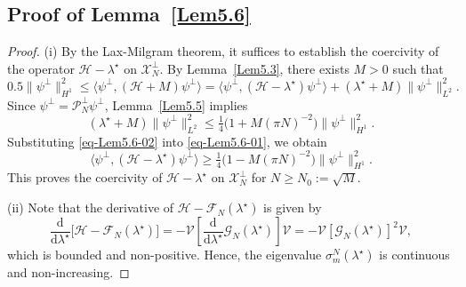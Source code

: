 \documentclass{sn-jnl}%
\numberwithin{equation}{section}
\theoremstyle{thmstyleone}%
\theoremstyle{thmstyletwo}%
\theoremstyle{thmstylethree}%
\begin{document}
\begin{appendices}
\section{Proof of Lemma~\ref{Lem5.6}}\label{proofLem5.6}
\begin{proof}
 (i) By the Lax-Milgram theorem, it suffices to establish the coercivity of the operator $\mathcal{H}-\lambda^\star$ on $\mathscr{X}_N^\perp$. 
By Lemma~\ref{Lem5.3}, there exists $M>0$ such that
\begin{equation}\label{eq-Lem5.6-01}
0.5 \|\psi^\perp\|_{H^1}^2
\leq 
\langle \psi^\perp, (\mathcal{H}+M)\psi^\perp\rangle
=
\langle \psi^\perp, (\mathcal{H}-\lambda^\star)\psi^\perp\rangle 
+ (\lambda^\star+M)\|\psi^\perp\|_{L^2}^2.
\end{equation}
Since $\psi^\perp = \mathcal{P}_N^\perp \psi^\perp$, Lemma~\ref{Lem5.5} implies
\begin{equation}\label{eq-Lem5.6-02}
(\lambda^\star+M)\|\psi^\perp\|_{L^2}^2 
\leq 
\tfrac14 \bigl(1 + M(\pi N)^{-2}\bigr)\|\psi^\perp\|_{H^1}^2.
\end{equation}
Substituting \eqref{eq-Lem5.6-02} into \eqref{eq-Lem5.6-01}, we obtain
\begin{equation}
\langle \psi^\perp, (\mathcal{H}-\lambda^\star)\psi^\perp\rangle
\geq  \tfrac14 \bigl(1 - M(\pi N)^{-2}\bigr)\|\psi^\perp\|_{H^1}^2.
\end{equation}
This proves the coercivity of $\mathcal{H}-\lambda^\star$ on $\mathscr{X}_N^\perp$ for $N\geq N_0:= \sqrt{M}$.

    (ii) Note that the derivative of $\mathcal{H} - \mathcal{F}_N(\lambda^\star)$ is given by
    \[
    \frac{\mathrm{d}}{\mathrm{d} \lambda^\star} \bigl[\mathcal{H} - \mathcal{F}_N(\lambda^\star)\bigr] = -\mathcal{V} \left[\frac{\mathrm{d}}{\mathrm{d} \lambda^\star} \mathcal{G}_N(\lambda^\star)\right] \mathcal{V} = -\mathcal{V} \left[\mathcal{G}_N(\lambda^\star)\right]^2 \mathcal{V},
    \]
    which is bounded and non-positive. Hence, the eigenvalue $\sigma_m^N(\lambda^\star)$ is continuous and non-increasing.


\end{proof}
\end{appendices}
\end{document}
